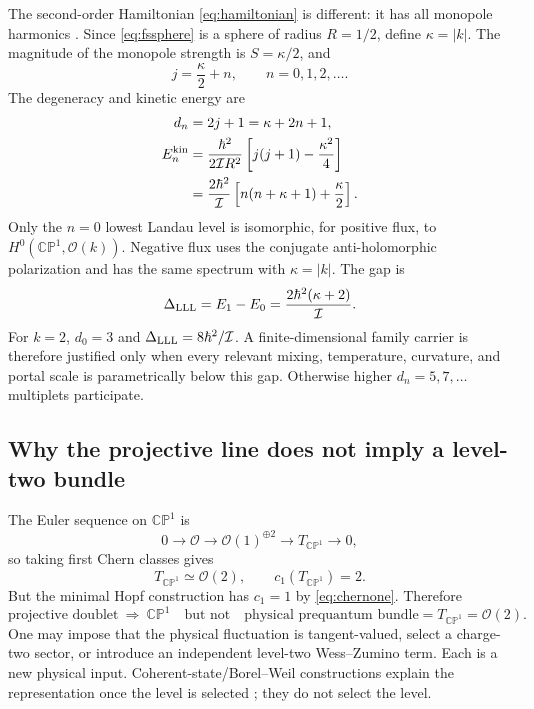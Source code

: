 \documentclass[11pt]{article}
\numberwithin{equation}{section}
\newcommand{\CP}{\mathbb{CP}}
\newcommand{\cO}{\mathcal O}
\newcommand{\cI}{\mathcal I}
\begin{document}
The second-order Hamiltonian \eqref{eq:hamiltonian} is different: it has all
monopole harmonics \cite{WuYang1976,BykovSmilga2023}.  Since
\eqref{eq:fssphere} is a sphere of radius \(R=1/2\), define
\(\kappa=|k|\).  The magnitude of the monopole strength is
\(S=\kappa/2\), and
\begin{equation}
 j=\frac{\kappa}{2}+n,
 \qquad n=0,1,2,\ldots.
 \label{eq:jn}
\end{equation}
The degeneracy and kinetic energy are
\begin{align}
 d_n&=2j+1=\kappa+2n+1,
 \label{eq:degeneracy}\\
 E_n^{\rm kin}
 &=\frac{\hbar^2}{2\cI R^2}
 \left[j(j+1)-\frac{\kappa^2}{4}\right]
 \notag\\
 &=\frac{2\hbar^2}{\cI}
 \left[n(n+\kappa+1)+\frac{\kappa}{2}\right].
 \label{eq:rotorspectrum}
\end{align}
Only the \(n=0\) lowest Landau level is isomorphic, for positive flux, to
\(H^0(\CP^1,\cO(k))\).  Negative flux uses the conjugate anti-holomorphic
polarization and has the same spectrum with \(\kappa=|k|\).  The gap is
\begin{equation}
 \Delta_{\rm LLL}=E_1-E_0
 =\frac{2\hbar^2(\kappa+2)}{\cI}.
 \label{eq:LLLgap}
\end{equation}
For \(k=2\), \(d_0=3\) and
\(\Delta_{\rm LLL}=8\hbar^2/\cI\).  A finite-dimensional family carrier is
therefore justified only when every relevant mixing, temperature, curvature,
and portal scale is parametrically below this gap.  Otherwise higher
\(d_n=5,7,\ldots\) multiplets participate.

\subsection{Why the projective line does not imply a level-two bundle}

The Euler sequence on \(\CP^1\) is
\begin{equation}
 0\longrightarrow\cO
 \longrightarrow\cO(1)^{\oplus2}
 \longrightarrow T_{\CP^1}\longrightarrow0,
 \label{eq:eulersequence}
\end{equation}
so taking first Chern classes gives
\begin{equation}
 T_{\CP^1}\simeq\cO(2),
 \qquad c_1(T_{\CP^1})=2.
 \label{eq:tangento2}
\end{equation}
But the minimal Hopf construction has \(c_1=1\) by \eqref{eq:chernone}.
Therefore
\begin{equation}
 \boxed{\text{projective doublet}\ \Longrightarrow\ \CP^1
 \quad\text{but not}\quad
 \text{physical prequantum bundle}=T_{\CP^1}=\cO(2).}
 \label{eq:o2obstruction}
\end{equation}
One may impose that the physical fluctuation is tangent-valued, select a
charge-two sector, or introduce an independent level-two Wess--Zumino term.
Each is a new physical input.  Coherent-state/Borel--Weil constructions explain
the representation once the level is selected \cite{Perelomov1972}; they do
not select the level.
\end{document}
